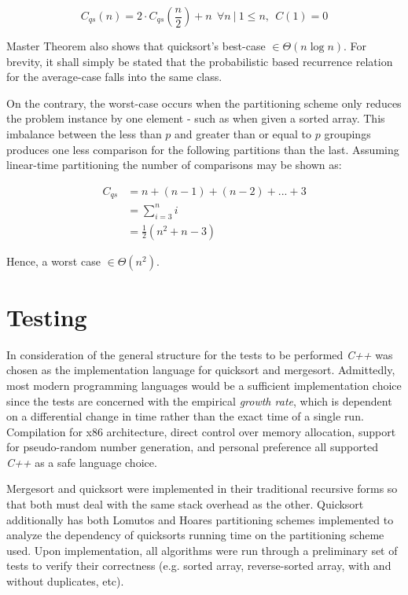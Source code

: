 \documentclass[11pt,letterpaper]{report}
\begin{document}
\begin{equation} 
C_{qs}(n)=2 \cdot C_{qs}(\frac{n}{2})+n \ \ \forall n ~| \ 1 \leq n, \ \ C(1) = 0 
\end{equation}

Master Theorem also shows that quicksort's best-case $\in \Theta(n\log{}n)$. For brevity, it shall simply be stated that the probabilistic based recurrence relation for the average-case falls into the same class.

On the contrary, the worst-case occurs when the partitioning scheme only reduces the problem instance by one element - such as when given a sorted array. This imbalance between the less than $p$ and greater than or equal to $p$ groupings produces one less comparison for the following partitions than the last. Assuming linear-time partitioning the number of comparisons may be shown as:

\begin{equation} \label{eq1}
\begin{split}
C_{qs} 	     & =n+(n-1)+(n-2)+...+3 \\
                      & = \sum_{i=3}^{n}i \\
                      & = \frac{1}{2}(n^2+n-3)
\end{split}
\end{equation}


Hence, a worst case $\in \Theta(n^2)$.

\section*{Testing}
In consideration of the general structure for the tests to be performed \emph{C++} was chosen as the implementation language for quicksort and mergesort. Admittedly, most modern programming languages would be a sufficient implementation choice since the tests are concerned with the empirical \emph{growth rate}, which is dependent on a differential change in time rather than the exact time of a single run. Compilation for x86 architecture, direct control over memory allocation, support for pseudo-random number generation, and personal preference all supported \emph{C++} as a safe language choice.

Mergesort and quicksort were implemented in their traditional recursive forms so that both must deal with the same stack overhead as the other. Quicksort additionally has both Lomutos and Hoares partitioning schemes implemented to analyze the dependency of quicksorts running time on the partitioning scheme used. Upon implementation, all algorithms were run through a preliminary set of tests to verify their correctness (e.g. sorted array, reverse-sorted array, with and without duplicates, etc).
\end{document}
